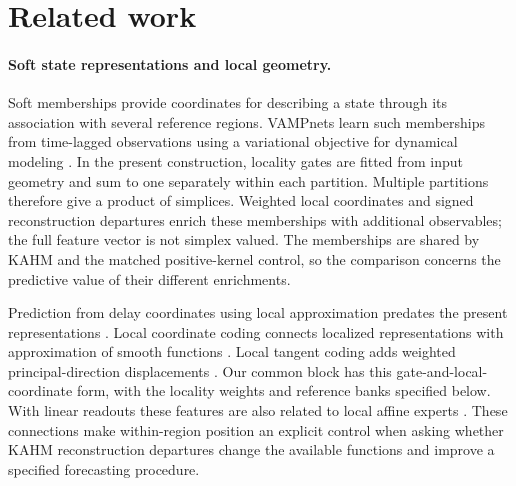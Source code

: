 \section{Related work}\label{sec:related}

\paragraph{Soft state representations and local geometry.}
Soft memberships provide coordinates for describing a state through its
association with several reference regions. VAMPnets learn such
memberships from time-lagged observations using a variational objective
for dynamical modeling \citep{Mardt2018VAMPnets}. In the present
construction, locality gates are fitted from input geometry and sum to
one separately within each partition. Multiple partitions therefore
give a product of simplices. Weighted local coordinates and signed
reconstruction departures enrich these memberships with additional
observables; the full feature vector is not simplex valued.
The memberships are shared by KAHM and the matched positive-kernel
control, so the comparison concerns the predictive value of their
different enrichments.

Prediction from delay coordinates using local approximation predates
the present representations \citep{Farmer1987Prediction}. Local coordinate coding
connects localized representations with approximation of smooth
functions \citep{Yu2009LCC}. Local tangent coding adds weighted
principal-direction displacements \citep{Yu2010LTC}. Our common block
has this gate-and-local-coordinate form, with the locality weights and
reference banks specified below. With linear readouts these features
are also related to local affine experts \citep{Jacobs1991Experts}.
These connections make within-region position an explicit control when
asking whether KAHM reconstruction departures change the available
functions and improve a specified forecasting procedure.

